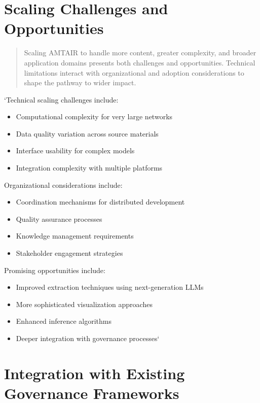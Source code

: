 \documentclass[]{book}
\providecommand{\tightlist}{%
  \setlength{\itemsep}{0pt}\setlength{\parskip}{0pt}}
\begin{document}
\section{Scaling Challenges and
Opportunities}\label{sec-scaling-challenges}

\begin{quote}
Scaling AMTAIR to handle more content, greater complexity, and broader
application domains presents both challenges and opportunities.
Technical limitations interact with organizational and adoption
considerations to shape the pathway to wider impact.
\end{quote}

`Technical scaling challenges include:

\begin{itemize}
\tightlist
\item
  Computational complexity for very large networks
\item
  Data quality variation across source materials
\item
  Interface usability for complex models
\item
  Integration complexity with multiple platforms
\end{itemize}

Organizational considerations include:

\begin{itemize}
\tightlist
\item
  Coordination mechanisms for distributed development
\item
  Quality assurance processes
\item
  Knowledge management requirements
\item
  Stakeholder engagement strategies
\end{itemize}

Promising opportunities include:

\begin{itemize}
\tightlist
\item
  Improved extraction techniques using next-generation LLMs
\item
  More sophisticated visualization approaches
\item
  Enhanced inference algorithms
\item
  Deeper integration with governance processes`
\end{itemize}

\section{Integration with Existing Governance
Frameworks}\label{sec-integration}
\end{document}

